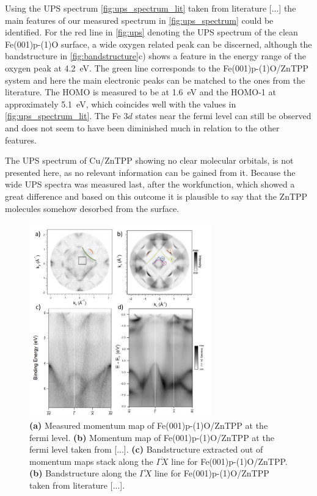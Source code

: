\FloatBarrier
Using the UPS spectrum \autoref{fig:ups_spectrum_lit} taken from literature [...] the main features of our measured spectrum in \autoref{fig:ups_spectrum} could be identified.
For the red line in \autoref{fig:ups} denoting the UPS spectrum of the clean Fe(001)p-(1)O surface, a wide oxygen related peak can be discerned, although the bandstructure in \autoref{fig:bandstructure}c) shows a feature in the energy range of the oxygen peak at \qty{4.2}{eV}.
The green line corresponds to the Fe(001)p-(1)O/ZnTPP system and here the main electronic peaks can be matched to the ones from the literature.
The HOMO is measured to be at \qty{1.6}{eV} and the HOMO-1 at approximately \qty{5.1}{eV}, which coincides well with the values in \autoref{fig:ups_spectrum_lit}.
The Fe $3d$ states near the fermi level can still be observed and does not seem to have been diminished much in relation to the other features.

The UPS spectrum of Cu/ZnTPP showing no clear molecular orbitals, is not presented here, as no relevant information can be gained from it.
Because the wide UPS spectra was measured last, after the workfunction, which showed a great difference and based on this outcome it is plausible to say that the ZnTPP molecules somehow desorbed from the surface.

\begin{figure}[h]
    \centering
    \includegraphics[width = 0.7\textwidth]{Plots/bandstructure.png}
    \caption{\textbf{(a)} Measured momentum map of Fe(001)p-(1)O/ZnTPP at the fermi level. \textbf{(b)} Momentum map of Fe(001)p-(1)O/ZnTPP at the fermi level taken from [...]. \textbf{(c)} Bandstructure extracted out of momentum maps stack along the $\overline{\Gamma X}$ line for Fe(001)p-(1)O/ZnTPP. \textbf{(b)} Bandstructure along the $\overline{\Gamma X}$ line for Fe(001)p-(1)O/ZnTPP taken from literature [...].}
    \label{fig:bandstructure}
\end{figure}
\FloatBarrier

